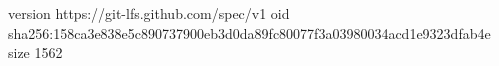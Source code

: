 version https://git-lfs.github.com/spec/v1
oid sha256:158ca3e838e5c890737900eb3d0da89fc80077f3a03980034acd1e9323dfab4e
size 1562

